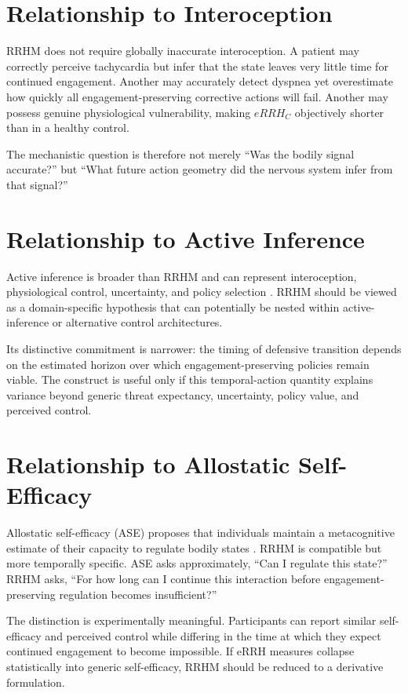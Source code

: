 \documentclass[11pt]{article}
\begin{document}
\section{Relationship to Interoception}

RRHM does not require globally inaccurate interoception. A patient may correctly perceive tachycardia but infer that the state leaves very little time for continued engagement. Another may accurately detect dyspnea yet overestimate how quickly all engagement-preserving corrective actions will fail. Another may possess genuine physiological vulnerability, making $eRRH_C$ objectively shorter than in a healthy control.

The mechanistic question is therefore not merely ``Was the bodily signal accurate?'' but ``What future action geometry did the nervous system infer from that signal?''

\section{Relationship to Active Inference}

Active inference is broader than RRHM and can represent interoception, physiological control, uncertainty, and policy selection \cite{paulus2019}. RRHM should be viewed as a domain-specific hypothesis that can potentially be nested within active-inference or alternative control architectures.

Its distinctive commitment is narrower: the timing of defensive transition depends on the estimated horizon over which engagement-preserving policies remain viable. The construct is useful only if this temporal-action quantity explains variance beyond generic threat expectancy, uncertainty, policy value, and perceived control.

\section{Relationship to Allostatic Self-Efficacy}

Allostatic self-efficacy (ASE) proposes that individuals maintain a metacognitive estimate of their capacity to regulate bodily states \cite{stephan2016}. RRHM is compatible but more temporally specific. ASE asks approximately, ``Can I regulate this state?'' RRHM asks, ``For how long can I continue this interaction before engagement-preserving regulation becomes insufficient?''

The distinction is experimentally meaningful. Participants can report similar self-efficacy and perceived control while differing in the time at which they expect continued engagement to become impossible. If eRRH measures collapse statistically into generic self-efficacy, RRHM should be reduced to a derivative formulation.
\end{document}
